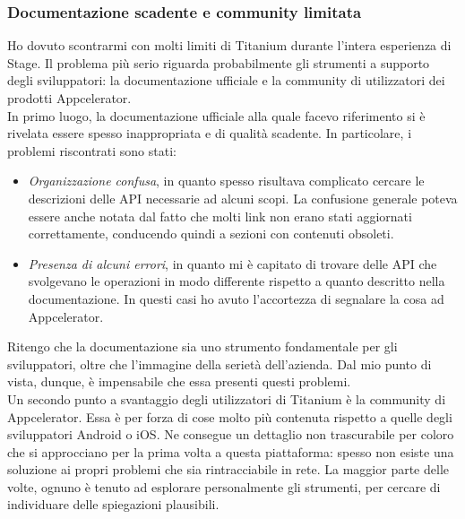 			\subsubsection{Documentazione scadente e community limitata}
				Ho dovuto scontrarmi con molti limiti di Titanium durante l'intera esperienza di Stage. Il problema più serio
				riguarda probabilmente gli strumenti a supporto degli sviluppatori: la documentazione ufficiale e la community di
				utilizzatori dei prodotti Appcelerator.\\
				In primo luogo, la documentazione ufficiale alla quale facevo riferimento si è rivelata essere spesso inappropriata e
				di qualità scadente. In particolare, i problemi riscontrati sono stati:
				\begin{itemize}
					\item \emph{Organizzazione confusa}, in quanto spesso risultava complicato cercare le descrizioni delle API
					necessarie ad alcuni scopi. La confusione generale poteva essere anche notata dal fatto che molti link non
					erano stati aggiornati correttamente, conducendo quindi a sezioni con contenuti obsoleti.
					\item \emph{Presenza di alcuni errori}, in quanto mi è capitato di trovare delle API che svolgevano le
					operazioni in modo differente rispetto a quanto descritto nella documentazione. In questi casi ho avuto
					l'accortezza di segnalare la cosa ad Appcelerator.
				\end{itemize}
				Ritengo che la documentazione sia uno strumento fondamentale per gli sviluppatori, oltre che l'immagine della serietà
				dell'azienda. Dal mio punto di vista, dunque, è impensabile che essa presenti questi problemi.\\
				Un secondo punto a svantaggio degli utilizzatori di Titanium è la community di Appcelerator. Essa è per forza di cose
				molto più contenuta rispetto a quelle degli sviluppatori Android o iOS. Ne consegue un dettaglio non trascurabile per
				coloro che si approcciano per la prima volta a questa piattaforma: spesso non esiste una soluzione ai propri problemi
				che sia rintracciabile in rete. La maggior parte delle volte, ognuno è tenuto ad esplorare personalmente gli strumenti,
				per cercare di individuare delle spiegazioni plausibili.

